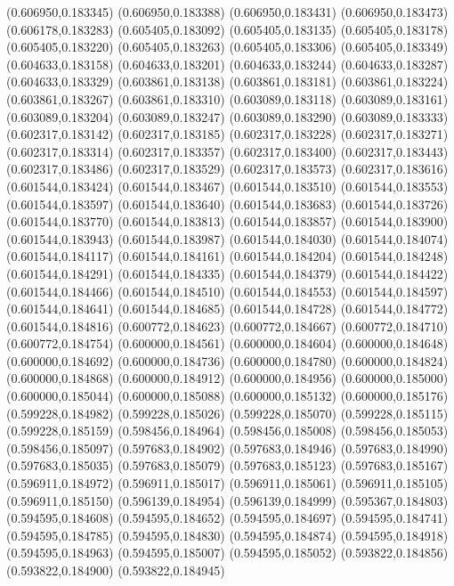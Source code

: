 (0.606950,0.183345)
(0.606950,0.183388)
(0.606950,0.183431)
(0.606950,0.183473)
(0.606178,0.183283)
(0.605405,0.183092)
(0.605405,0.183135)
(0.605405,0.183178)
(0.605405,0.183220)
(0.605405,0.183263)
(0.605405,0.183306)
(0.605405,0.183349)
(0.604633,0.183158)
(0.604633,0.183201)
(0.604633,0.183244)
(0.604633,0.183287)
(0.604633,0.183329)
(0.603861,0.183138)
(0.603861,0.183181)
(0.603861,0.183224)
(0.603861,0.183267)
(0.603861,0.183310)
(0.603089,0.183118)
(0.603089,0.183161)
(0.603089,0.183204)
(0.603089,0.183247)
(0.603089,0.183290)
(0.603089,0.183333)
(0.602317,0.183142)
(0.602317,0.183185)
(0.602317,0.183228)
(0.602317,0.183271)
(0.602317,0.183314)
(0.602317,0.183357)
(0.602317,0.183400)
(0.602317,0.183443)
(0.602317,0.183486)
(0.602317,0.183529)
(0.602317,0.183573)
(0.602317,0.183616)
(0.601544,0.183424)
(0.601544,0.183467)
(0.601544,0.183510)
(0.601544,0.183553)
(0.601544,0.183597)
(0.601544,0.183640)
(0.601544,0.183683)
(0.601544,0.183726)
(0.601544,0.183770)
(0.601544,0.183813)
(0.601544,0.183857)
(0.601544,0.183900)
(0.601544,0.183943)
(0.601544,0.183987)
(0.601544,0.184030)
(0.601544,0.184074)
(0.601544,0.184117)
(0.601544,0.184161)
(0.601544,0.184204)
(0.601544,0.184248)
(0.601544,0.184291)
(0.601544,0.184335)
(0.601544,0.184379)
(0.601544,0.184422)
(0.601544,0.184466)
(0.601544,0.184510)
(0.601544,0.184553)
(0.601544,0.184597)
(0.601544,0.184641)
(0.601544,0.184685)
(0.601544,0.184728)
(0.601544,0.184772)
(0.601544,0.184816)
(0.600772,0.184623)
(0.600772,0.184667)
(0.600772,0.184710)
(0.600772,0.184754)
(0.600000,0.184561)
(0.600000,0.184604)
(0.600000,0.184648)
(0.600000,0.184692)
(0.600000,0.184736)
(0.600000,0.184780)
(0.600000,0.184824)
(0.600000,0.184868)
(0.600000,0.184912)
(0.600000,0.184956)
(0.600000,0.185000)
(0.600000,0.185044)
(0.600000,0.185088)
(0.600000,0.185132)
(0.600000,0.185176)
(0.599228,0.184982)
(0.599228,0.185026)
(0.599228,0.185070)
(0.599228,0.185115)
(0.599228,0.185159)
(0.598456,0.184964)
(0.598456,0.185008)
(0.598456,0.185053)
(0.598456,0.185097)
(0.597683,0.184902)
(0.597683,0.184946)
(0.597683,0.184990)
(0.597683,0.185035)
(0.597683,0.185079)
(0.597683,0.185123)
(0.597683,0.185167)
(0.596911,0.184972)
(0.596911,0.185017)
(0.596911,0.185061)
(0.596911,0.185105)
(0.596911,0.185150)
(0.596139,0.184954)
(0.596139,0.184999)
(0.595367,0.184803)
(0.594595,0.184608)
(0.594595,0.184652)
(0.594595,0.184697)
(0.594595,0.184741)
(0.594595,0.184785)
(0.594595,0.184830)
(0.594595,0.184874)
(0.594595,0.184918)
(0.594595,0.184963)
(0.594595,0.185007)
(0.594595,0.185052)
(0.593822,0.184856)
(0.593822,0.184900)
(0.593822,0.184945)
